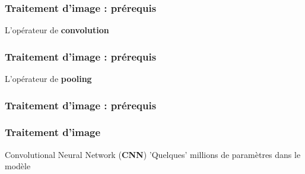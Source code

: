 \begin{frame}
  \frametitle{Traitement d'image : prérequis}
  L'opérateur de \textbf{convolution}
\end{frame}

\begin{frame}
  \frametitle{Traitement d'image : prérequis}
  L'opérateur de \textbf{pooling}
\end{frame}

\begin{frame}
  \frametitle{Traitement d'image : prérequis}
\end{frame}

\begin{frame}
  \frametitle{Traitement d'image}
  Convolutional Neural Network (\textbf{CNN})
  'Quelques' millions de paramètres dans le modèle
\end{frame}


